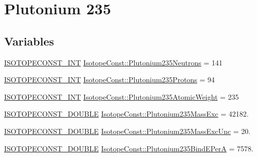 \hypertarget{group___isotope_const-_plutonium-_pu235}{}\section{Plutonium 235}
\label{group___isotope_const-_plutonium-_pu235}
\subsection*{Variables}
\begin{DoxyCompactItemize}
\item 
\mbox{\hyperlink{group___isotope_const-_macros_ga5f18360b3e99483a35c32d789e62621c}{I\+S\+O\+T\+O\+P\+E\+C\+O\+N\+S\+T\+\_\+\+I\+NT}} \mbox{\hyperlink{group___isotope_const-_plutonium-_pu235_gae4e6bfe1ca36432f4cb016df2db8203f}{Isotope\+Const\+::\+Plutonium235\+Neutrons}} = 141
\item 
\mbox{\hyperlink{group___isotope_const-_macros_ga5f18360b3e99483a35c32d789e62621c}{I\+S\+O\+T\+O\+P\+E\+C\+O\+N\+S\+T\+\_\+\+I\+NT}} \mbox{\hyperlink{group___isotope_const-_plutonium-_pu235_ga52cda6cbd7c9e946f2c9b98ba47cf61a}{Isotope\+Const\+::\+Plutonium235\+Protons}} = 94
\item 
\mbox{\hyperlink{group___isotope_const-_macros_ga5f18360b3e99483a35c32d789e62621c}{I\+S\+O\+T\+O\+P\+E\+C\+O\+N\+S\+T\+\_\+\+I\+NT}} \mbox{\hyperlink{group___isotope_const-_plutonium-_pu235_gad1fafe899ae657ad963918d2a53c4c17}{Isotope\+Const\+::\+Plutonium235\+Atomic\+Weight}} = 235
\item 
\mbox{\hyperlink{group___isotope_const-_macros_ga8f45a7272ce02c0b4c65c44636ed719a}{I\+S\+O\+T\+O\+P\+E\+C\+O\+N\+S\+T\+\_\+\+D\+O\+U\+B\+LE}} \mbox{\hyperlink{group___isotope_const-_plutonium-_pu235_gabb72e1e32ad81f37329641d693ee5850}{Isotope\+Const\+::\+Plutonium235\+Mass\+Exc}} = 42182.
\item 
\mbox{\hyperlink{group___isotope_const-_macros_ga8f45a7272ce02c0b4c65c44636ed719a}{I\+S\+O\+T\+O\+P\+E\+C\+O\+N\+S\+T\+\_\+\+D\+O\+U\+B\+LE}} \mbox{\hyperlink{group___isotope_const-_plutonium-_pu235_ga813cc4d0fa89969c7653ffa03b35e672}{Isotope\+Const\+::\+Plutonium235\+Mass\+Exc\+Unc}} = 20.
\item 
\mbox{\hyperlink{group___isotope_const-_macros_ga8f45a7272ce02c0b4c65c44636ed719a}{I\+S\+O\+T\+O\+P\+E\+C\+O\+N\+S\+T\+\_\+\+D\+O\+U\+B\+LE}} \mbox{\hyperlink{group___isotope_const-_plutonium-_pu235_gaecd4240edf1f2e29e19ec6f9a5d71bd6}{Isotope\+Const\+::\+Plutonium235\+Bind\+E\+PerA}} = 7578.
\item 

\end{DoxyCompactItemize}
